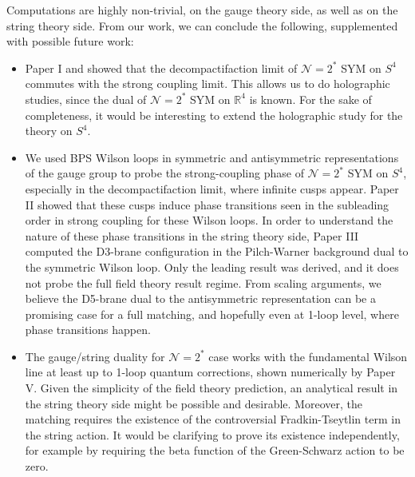 Computations are highly non-trivial, 
on the gauge theory side, 
as well as on the string theory side. 
From our work, we can conclude the following, supplemented with possible future work:
\begin{itemize}
 \item Paper I and \cite{Zarembo:2014ooa} showed that the decompactifaction limit of $\mathcal{N}=2^*$ SYM on $S^4$ 
 commutes with the strong coupling limit. 
 This allows us to do holographic studies, 
 since the dual of $\mathcal{N}=2^*$ SYM on $\mathbb{R}^4$ is known. 
 For the sake of completeness, it would be interesting to extend the holographic study for the theory on $S^4$.
 
 \item 
 We used BPS Wilson loops in symmetric and antisymmetric representations of the gauge group to probe the strong-coupling phase of $\mathcal{N}=2^*$ SYM on $S^4$,
 especially in the decompactifaction limit, where infinite cusps appear.
 Paper II showed that these cusps induce phase transitions seen in the subleading order in strong coupling for these Wilson loops.
 In order to understand the nature of these phase transitions in the string theory side, 
 Paper III computed the D3-brane configuration in the Pilch-Warner background dual to the symmetric Wilson loop. 
 Only the leading result was derived, and it does not probe the full field theory result regime.
 From scaling arguments, we believe the D5-brane dual to the antisymmetric representation can be a promising case 
 for a full matching, and hopefully even at 1-loop level, where phase transitions happen. 
% 
 
 
 \item The gauge/string duality for $\mathcal{N}=2^*$ case works with the fundamental Wilson line at least up to 1-loop quantum corrections, 
 shown numerically by Paper V. Given the simplicity of the field theory prediction, 
 an analytical result in the string theory side might be possible and desirable. 
 Moreover, the matching requires the existence of the controversial Fradkin-Tseytlin term in the string action. 
 It would be clarifying to prove its existence independently, for example by requiring the beta function of the Green-Schwarz action to be zero.
 

\end{itemize}
